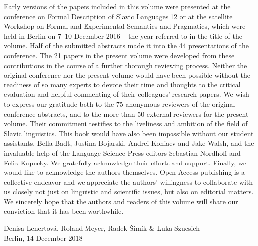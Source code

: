 \begin{refsection}
Early versions of the papers included in this volume were presented at the conference on Formal Description of Slavic Languages 12 or at the satellite Workshop on Formal and Experimental Semantics and Pragmatics, which were held in Berlin on 7--10 December 2016 -- the year referred to in the title of the volume. Half of the submitted abstracts made it into the 44 presentations of the conference. The 21 papers in the present volume were developed from these contributions in the course of a further thorough reviewing process. Neither the original conference nor the present volume would have been possible without the readiness of so many experts to devote their time and thoughts to the critical evaluation and helpful commenting of their colleagues' research papers. We wish to express our gratitude both to the 75 anonymous reviewers of the original conference abstracts, and to the more than 50 external reviewers for the present volume. Their commitment testifies to the liveliness and ambition of the field of Slavic linguistics. This book would have also been impossible without our student assistants, Bella Badt, Justina Bojarski, Andrei Koniaev and Jake Walsh, and the invaluable help of the Language Science Press editors Sebastian Nordhoff and Felix Kopecky. We gratefully acknowledge their efforts and support. Finally, we would like to acknowledge the authors themselves. Open Access publishing is a collective endeavor and we appreciate the authors' willingness to collaborate with us closely not just on linguistic and scientific issues, but also on editorial matters. We sincerely hope that the authors and readers of this volume will share our conviction that it has been worthwhile.

\null\hfill Denisa Lenertová, Roland Meyer, Radek Šimík \& Luka Szucsich\\
\null\hfill Berlin, 14 December 2018
\end{refsection}

